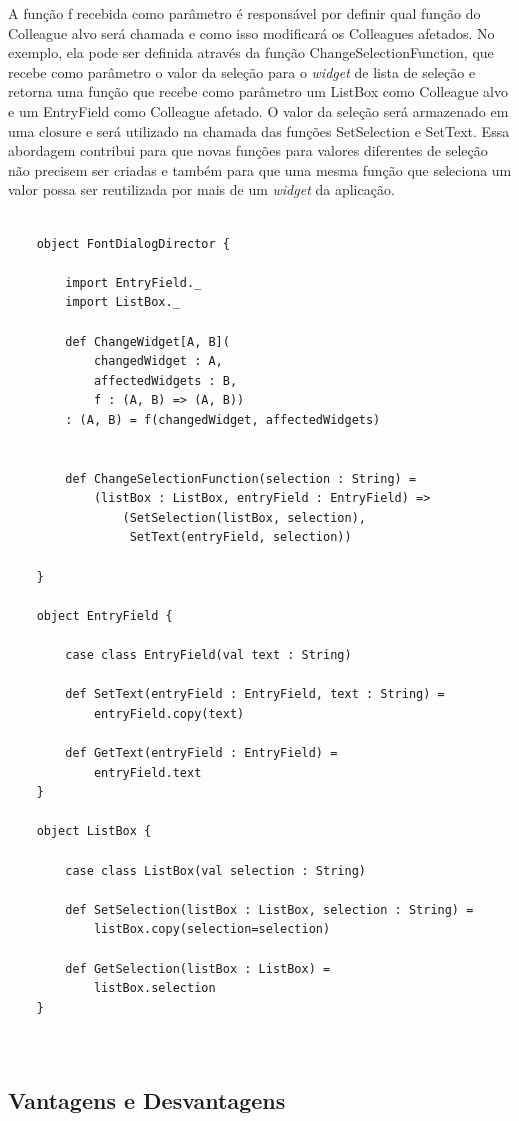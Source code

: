 A função f recebida como parâmetro é responsável por 
definir qual função do Colleague alvo será chamada e 
como isso modificará os Colleagues afetados. No exemplo, 
ela pode ser definida através da função ChangeSelectionFunction, 
que recebe como parâmetro o valor da seleção para o \textit{widget} 
de lista de seleção e retorna uma função que recebe como parâmetro 
um ListBox como Colleague alvo e um EntryField como 
Colleague afetado. O valor da seleção será armazenado 
em uma closure e será utilizado na chamada das funções 
SetSelection e SetText. Essa abordagem contribui 
para que novas funções para valores diferentes de 
seleção não precisem ser criadas e também para que 
uma mesma função que seleciona um valor possa ser 
reutilizada por mais de um \textit{widget} da aplicação.

\begin{lstlisting}[caption={Mediator Funcional},label=fpmediator]
    
	object FontDialogDirector {

		import EntryField._
		import ListBox._
	
		def ChangeWidget[A, B](
			changedWidget : A,
			affectedWidgets : B,
			f : (A, B) => (A, B)) 
		: (A, B) = f(changedWidget, affectedWidgets)
	
	
		def ChangeSelectionFunction(selection : String) = 
			(listBox : ListBox, entryField : EntryField) => 
				(SetSelection(listBox, selection), 
				 SetText(entryField, selection))
	
	}
	
	object EntryField {
	
		case class EntryField(val text : String)
	
		def SetText(entryField : EntryField, text : String) = 
			entryField.copy(text)
		
		def GetText(entryField : EntryField) = 
			entryField.text
	}
	
	object ListBox {
	
		case class ListBox(val selection : String)
		
		def SetSelection(listBox : ListBox, selection : String) = 
			listBox.copy(selection=selection)
		
		def GetSelection(listBox : ListBox) = 
			listBox.selection
	}
	
    
\end{lstlisting}

\subsection*{Vantagens e Desvantagens}

